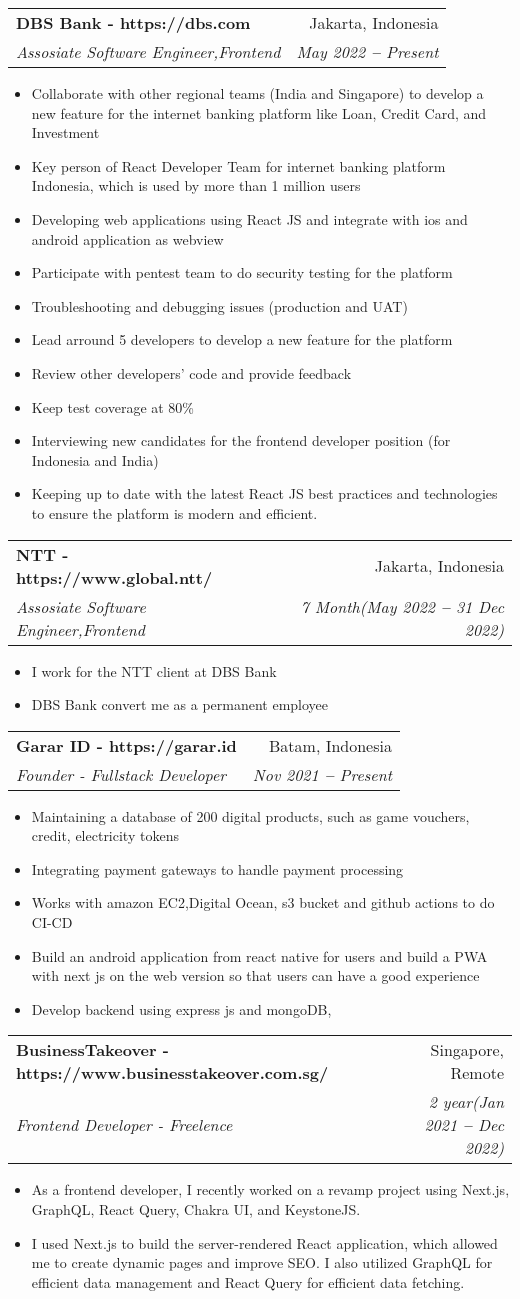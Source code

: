 \documentclass[letterpaper,11pt]{article}
\makeatletter
\newcommand{\resumeItem}[1]{
  \item\small{
    {#1 \vspace{-2pt}}
  }
}
\newcommand{\resumeSubheading}[4]{
  \vspace{-2pt}\item
    \begin{tabular*}{0.97\textwidth}[t]{l@{\extracolsep{\fill}}r}
      \textbf{#1} & #2 \\
      \textit{\small#3} & \textit{\small #4} \\
    \end{tabular*}\vspace{-7pt}
}
\newcommand{\resumeItemListStart}{\begin{itemize}}
\newcommand{\resumeItemListEnd}{\end{itemize}\vspace{-5pt}}
\makeatother
\begin{document}
    \resumeSubheading
      {DBS Bank - https://dbs.com}{Jakarta, Indonesia}
      {Assosiate Software Engineer,Frontend}{May 2022 \textbf{--} Present}
        \resumeItemListStart
            \resumeItem{Collaborate with other regional teams (India and Singapore) to develop a new feature for the internet banking platform like Loan, Credit Card, and Investment}
            \resumeItem{Key person of React Developer Team for internet banking platform Indonesia, which is used by more than 1 million users} 
            \resumeItem{Developing web applications using React JS and integrate with ios and android application as webview}
            \resumeItem{Participate with pentest team to do security testing for the platform}
            \resumeItem{Troubleshooting and debugging issues (production and UAT)}
            \resumeItem{Lead arround 5 developers to develop a new feature for the platform}
            \resumeItem{Review other developers' code and provide feedback}
            \resumeItem{Keep test coverage at 80\%}
            \resumeItem{Interviewing new candidates for the frontend developer position (for Indonesia and India)}
            \resumeItem{Keeping up to date with the latest React JS best practices and technologies to ensure the platform is modern and efficient.}
        \resumeItemListEnd
    \resumeSubheading
    {NTT - https://www.global.ntt/}{Jakarta, Indonesia}
    {Assosiate Software Engineer,Frontend}{7 Month(May 2022 \textbf{--} 31 Dec 2022)}
      \resumeItemListStart
          \resumeItem{I work for the NTT client at DBS Bank}
          \resumeItem{DBS Bank convert me as a permanent employee}
      \resumeItemListEnd
    \resumeSubheading
      {Garar ID - https://garar.id}{Batam, Indonesia}
      {Founder - Fullstack Developer}{Nov 2021 \textbf{--} Present}
        \resumeItemListStart
            \resumeItem{Maintaining a database of 200 digital products, such as game vouchers, credit, electricity tokens}
            \resumeItem{Integrating payment gateways to handle payment processing}
            \resumeItem{Works with amazon EC2,Digital Ocean, s3 bucket and github actions to do CI-CD}
            \resumeItem{Build an android application from react native for users and build a PWA with next js on the web version so that users
            can have a good experience}
            \resumeItem{Develop backend using express js and mongoDB,}
        \resumeItemListEnd
    \resumeSubheading
      {BusinessTakeover - https://www.businesstakeover.com.sg/}{Singapore, Remote}
      {Frontend Developer - Freelence}{2 year(Jan 2021 \textbf{--} Dec 2022)}
        \resumeItemListStart
            \resumeItem{As a frontend developer, I recently worked on a revamp project using Next.js, GraphQL, React Query, Chakra UI, and KeystoneJS.}
            \resumeItem{I used Next.js to build the server-rendered React application, which allowed me to create dynamic pages and improve SEO. I also utilized GraphQL for efficient data management and React Query for efficient data fetching.}
        \resumeItemListEnd
    
\end{document}
